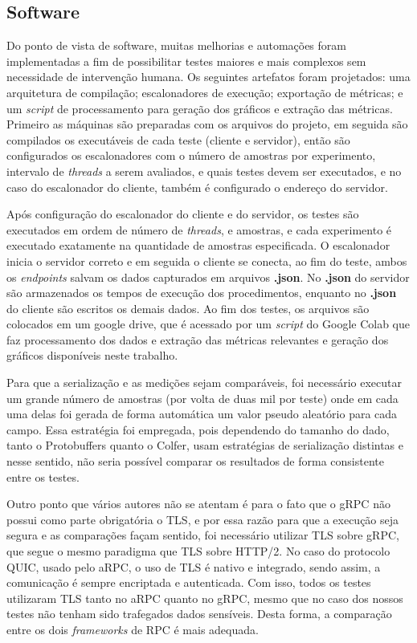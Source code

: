 \subsection{Software}
\label{sec:infraestrutura_execucao_software}

Do ponto de vista de software, muitas melhorias e automações foram implementadas a fim de possibilitar testes maiores e mais complexos sem necessidade de intervenção humana. Os seguintes artefatos foram projetados: uma arquitetura de compilação; escalonadores de execução; exportação de métricas; e um \textit{script} de processamento para geração dos gráficos e extração das métricas. Primeiro as máquinas são preparadas com os arquivos do projeto, em seguida são compilados os executáveis de cada teste (cliente e servidor), então são configurados os escalonadores com o número de amostras por experimento, intervalo de \textit{threads} a serem avaliados, e quais testes devem ser executados, e no caso do escalonador do cliente, também é configurado o endereço do servidor. 

Após configuração do escalonador do cliente e do servidor, os testes são executados em ordem de número de \textit{threads}, e amostras, e cada experimento é executado exatamente na quantidade de amostras especificada. O escalonador inicia o servidor correto e em seguida o cliente se conecta, ao fim do teste, ambos os \textit{endpoints} salvam os dados capturados em arquivos \textbf{.json}. No \textbf{.json} do servidor são armazenados os tempos de execução dos procedimentos, enquanto no \textbf{.json} do cliente são escritos os demais dados. Ao fim dos testes, os arquivos são colocados em um google drive, que é acessado por um \textit{script} do Google Colab que faz processamento dos dados e extração das métricas relevantes e geração dos gráficos disponíveis neste trabalho.

Para que a serialização e as medições sejam comparáveis, foi necessário executar um grande número de amostras (por volta de duas mil por teste) onde em cada uma delas foi gerada de forma automática um valor pseudo aleatório para cada campo. Essa estratégia foi empregada, pois dependendo do tamanho do dado, tanto o Protobuffers quanto o Colfer, usam estratégias de serialização distintas e nesse sentido, não seria possível comparar os resultados de forma consistente entre os testes.

Outro ponto que vários autores não se atentam é para o fato que o gRPC não possui como parte obrigatória o TLS, e por essa razão para que a execução seja segura e as comparações façam sentido, foi necessário utilizar TLS sobre gRPC, que segue o mesmo paradigma que TLS sobre HTTP/2. No caso do protocolo QUIC, usado pelo aRPC, o uso de TLS é nativo e integrado, sendo assim, a comunicação é sempre encriptada e autenticada. Com isso, todos os testes utilizaram TLS tanto no aRPC quanto no gRPC, mesmo que no caso dos nossos testes não tenham sido trafegados dados sensíveis. Desta forma, a comparação entre os dois \textit{frameworks} de RPC é mais adequada.

